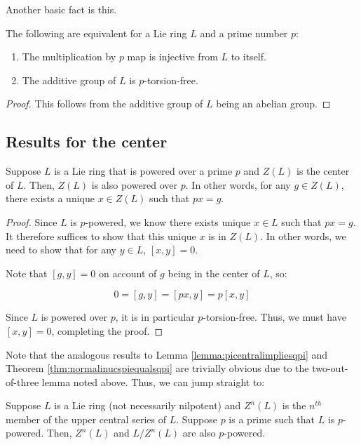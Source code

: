 Another basic fact is this.

\begin{lemma}
  The following are equivalent for a Lie ring $L$ and a prime number $p$:

  \begin{enumerate}
  \item The multiplication by $p$ map is injective from $L$ to itself.
  \item The additive group of $L$ is $p$-torsion-free.
  \end{enumerate}
\end{lemma}

\begin{proof}
  This follows from the additive group of $L$ being an abelian group.
\end{proof}

\subsection{Results for the center}

\begin{lemma}\label{lemma:centerispoweringinvariant-lie}
  Suppose $L$ is a Lie ring that is powered over a prime $p$ and
  $Z(L)$ is the center of $L$. Then, $Z(L)$ is also powered over
  $p$. In other words, for any $g \in Z(L)$, there exists a unique $x
  \in Z(L)$ such that $px = g$.
\end{lemma}

\begin{proof}
  Since $L$ is $p$-powered, we know there exists unique $x \in L$ such
  that $px = g$. It therefore suffices to show that this unique $x$ is
  in $Z(L)$. In other words, we need to show that for any $y \in L$,
  $[x,y] = 0$. 

  Note that $[g,y] = 0$ on account of $g$ being in the center of $L$,
  so:

  $$0 = [g,y] = [px,y] = p[x,y]$$

  Since $L$ is powered over $p$, it is in particular
  $p$-torsion-free. Thus, we must have $[x,y] = 0$, completing the proof.
\end{proof}

Note that the analogous results to Lemma \ref{lemma:picentralimpliesqpi} and
Theorem \ref{thm:normalinucspiequalsqpi} are trivially obvious due to the
two-out-of-three lemma noted above. Thus, we can jump straight to:

\begin{theorem}\label{thm:ucsqpi-lie}
  Suppose $L$ is a Lie ring (not necessarily nilpotent) and $Z^n(L)$ is
  the $n^{th}$ member of the upper central series of $L$. Suppose $p$
  is a prime such that $L$ is $p$-powered. Then, $Z^n(L)$ and
  $L/Z^n(L)$ are also $p$-powered.
\end{theorem}

